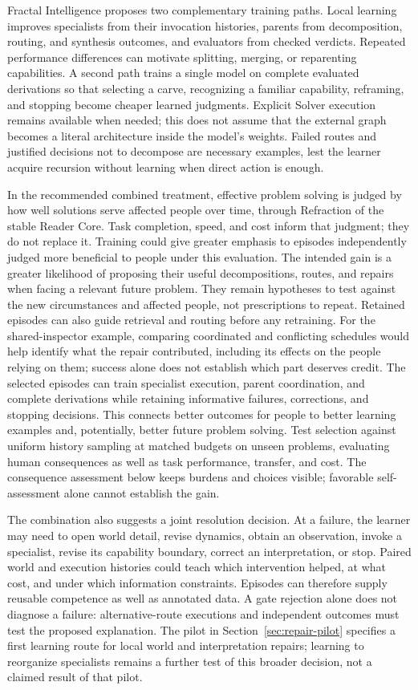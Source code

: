 \documentclass[10pt]{article}
\begin{document}
Fractal Intelligence proposes two complementary training paths. Local
learning improves specialists from their invocation histories, parents from
decomposition, routing, and synthesis outcomes, and evaluators from checked
verdicts. Repeated performance differences can motivate splitting, merging,
or reparenting capabilities. A second path trains a single model on complete
evaluated derivations so that selecting a carve, recognizing a familiar
capability, reframing, and stopping become cheaper learned judgments. Explicit
Solver execution remains available when needed; this does not assume that
the external graph becomes a literal architecture inside the model's weights.
Failed routes and justified decisions not to decompose are necessary examples,
lest the learner acquire recursion without learning when direct action is
enough.

In the recommended combined treatment, effective problem solving is judged by
how well solutions serve affected people over time, through Refraction of the
stable Reader Core. Task completion, speed, and cost inform that judgment;
they do not replace it. Training could give greater emphasis to episodes
independently judged more beneficial to people under this evaluation. The intended gain
is a greater likelihood of proposing their useful decompositions, routes, and
repairs when facing a relevant future problem. They remain hypotheses to test
against the new circumstances and affected people, not prescriptions to repeat.
Retained episodes can also guide retrieval and routing before any retraining.
For the shared-inspector example, comparing coordinated and conflicting
schedules would help identify what the repair contributed, including its
effects on the people relying on them; success alone does not establish which
part deserves credit. The selected episodes can train specialist execution,
parent coordination, and complete derivations while retaining informative
failures, corrections, and stopping decisions. This connects better outcomes
for people to better learning examples and, potentially, better future problem
solving. Test selection against uniform history sampling at matched budgets
on unseen problems, evaluating human consequences as well as task performance,
transfer, and cost. The consequence assessment below keeps burdens and choices
visible; favorable self-assessment alone cannot establish the gain.

The combination also suggests a joint resolution decision. At a failure, the
learner may need to open world detail, revise dynamics, obtain an observation,
invoke a specialist, revise its capability boundary, correct an interpretation,
or stop. Paired world and execution histories could teach which intervention
helped, at what cost, and under which information constraints. Episodes can
therefore supply reusable competence as well as annotated data. A gate
rejection alone does not diagnose a failure: alternative-route executions and
independent outcomes must test the proposed explanation. The pilot in Section~\ref{sec:repair-pilot}
specifies a first learning route for local world and interpretation repairs;
learning to reorganize specialists remains a further test of this broader
decision, not a claimed result of that pilot.
\end{document}
